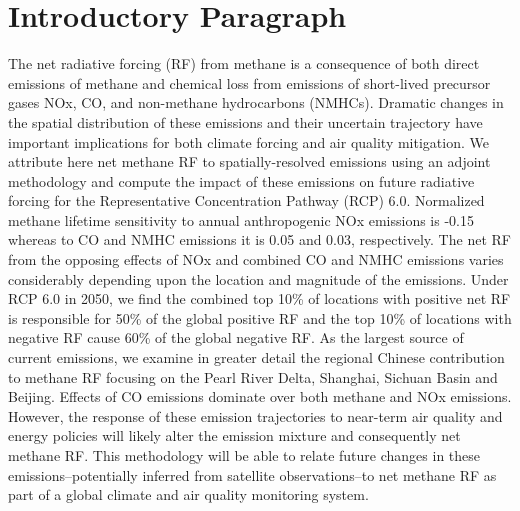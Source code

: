 \section*{Introductory Paragraph}

The net radiative forcing (RF) from methane is a consequence of both direct emissions of methane and chemical loss from emissions of short-lived precursor gases NOx, CO, and non-methane hydrocarbons (NMHCs). Dramatic changes in the spatial distribution of these emissions and their uncertain trajectory have important implications for both climate forcing and air quality mitigation.  We attribute here net methane RF  to spatially-resolved emissions using an adjoint methodology and compute the impact of these emissions on future radiative forcing for the Representative Concentration Pathway (RCP) 6.0.  Normalized methane lifetime sensitivity to annual anthropogenic NOx emissions is -0.15 whereas to CO and NMHC emissions it is 0.05 and 0.03, respectively. The net RF from the opposing effects of NOx and combined CO and NMHC emissions varies considerably depending upon the location and magnitude of the emissions.  Under RCP 6.0 in 2050,  we find the combined top 10\% of locations with positive net RF is responsible for 50\% of the global positive RF and the top 10\% of locations with negative RF cause 60\% of the global negative RF. As the largest source of current emissions, we examine in greater detail the regional Chinese contribution to methane RF focusing on the Pearl River Delta, Shanghai, Sichuan Basin and Beijing. Effects of CO emissions dominate over both methane and NOx emissions. However, the response of these emission trajectories to near-term air quality and energy policies will likely alter the emission mixture and consequently net methane RF. This methodology will be able to relate future changes in these emissions--potentially inferred from satellite observations--to net methane RF  as part of a global climate and air quality monitoring system. 